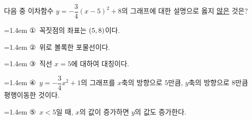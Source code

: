 다음 중 이차함수 $y=-\dfrac{3}{4}(x-5)^2+8$의 그래프에 대한 설명으로 옳지 \underline{않은} 것은?
\par\medskip\par\noindent\hangindent=1.4em {\small ①}\ 꼭짓점의 좌표는 $(5{,}\mkern3mu 8)$이다.\par\noindent\hangindent=1.4em {\small ②}\ 위로 볼록한 포물선이다.\par\noindent\hangindent=1.4em {\small ③}\ 직선 $x=5$에 대하여 대칭이다.\par\noindent\hangindent=1.4em {\small ④}\ $y=-\dfrac{3}{4}x^2+1$의 그래프를 $x$축의 방향으로 $5$만큼, $y$축의 방향으로 $8$만큼 평행이동한 것이다.\par\noindent\hangindent=1.4em {\small ⑤}\ $x<5$일 때, $x$의 값이 증가하면 $y$의 값도 증가한다.\par\medskip
